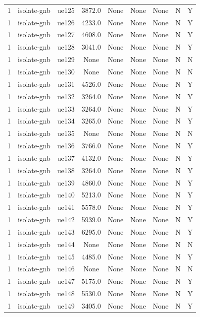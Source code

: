\begin{table}[ht]
\begin{tabular}{|c|c|c|c|c|c|c|c|c|}
1 & isolate-gnb & ue125 & 3872.0 & None & None & None & N & Y \\
1 & isolate-gnb & ue126 & 4233.0 & None & None & None & N & Y \\
1 & isolate-gnb & ue127 & 4608.0 & None & None & None & N & Y \\
1 & isolate-gnb & ue128 & 3041.0 & None & None & None & N & Y \\
1 & isolate-gnb & ue129 & None & None & None & None & N & N \\
1 & isolate-gnb & ue130 & None & None & None & None & N & N \\
1 & isolate-gnb & ue131 & 4526.0 & None & None & None & N & Y \\
1 & isolate-gnb & ue132 & 3264.0 & None & None & None & N & Y \\
1 & isolate-gnb & ue133 & 3264.0 & None & None & None & N & Y \\
1 & isolate-gnb & ue134 & 3265.0 & None & None & None & N & Y \\
1 & isolate-gnb & ue135 & None & None & None & None & N & N \\
1 & isolate-gnb & ue136 & 3766.0 & None & None & None & N & Y \\
1 & isolate-gnb & ue137 & 4132.0 & None & None & None & N & Y \\
1 & isolate-gnb & ue138 & 3264.0 & None & None & None & N & Y \\
1 & isolate-gnb & ue139 & 4860.0 & None & None & None & N & Y \\
1 & isolate-gnb & ue140 & 5213.0 & None & None & None & N & Y \\
1 & isolate-gnb & ue141 & 5578.0 & None & None & None & N & Y \\
1 & isolate-gnb & ue142 & 5939.0 & None & None & None & N & Y \\
1 & isolate-gnb & ue143 & 6295.0 & None & None & None & N & Y \\
1 & isolate-gnb & ue144 & None & None & None & None & N & N \\
1 & isolate-gnb & ue145 & 4485.0 & None & None & None & N & Y \\
1 & isolate-gnb & ue146 & None & None & None & None & N & N \\
1 & isolate-gnb & ue147 & 5175.0 & None & None & None & N & Y \\
1 & isolate-gnb & ue148 & 5530.0 & None & None & None & N & Y \\
1 & isolate-gnb & ue149 & 3405.0 & None & None & None & N & Y \\

\end{tabular}
\end{table}
